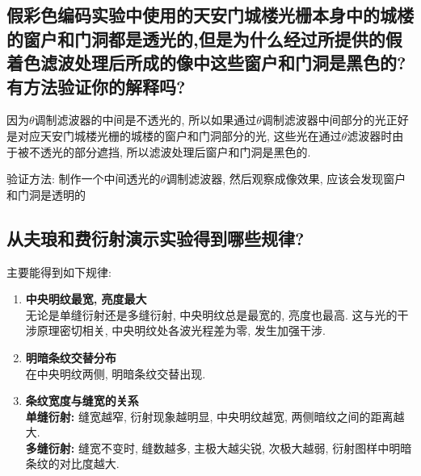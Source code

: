 \documentclass[zihao=5, UTF8]{article}
\theoremstyle{MyLineTheoremStyle} %
\theoremstyle{MyBlockTheoremStyle} %
\theoremstyle{MySubsubsectionStyle} %
\begin{document}
\subsection{假彩色编码实验中使用的天安门城楼光栅本身中的城楼的窗户和门洞都是透光的,但是为什么经过所提供的假着色滤波处理后所成的像中这些窗户和门洞是黑色的?有方法验证你的解释吗?}
因为$\theta$调制滤波器的中间是不透光的, 所以如果通过$\theta$调制滤波器中间部分的光正好是对应天安门城楼光栅的城楼的窗户和门洞部分的光, 这些光在通过$\theta$滤波器时由于被不透光的部分遮挡, 所以滤波处理后窗户和门洞是黑色的. 

验证方法: 制作一个中间透光的$\theta$调制滤波器, 然后观察成像效果, 应该会发现窗户和门洞是透明的
\subsection{从夫琅和费衍射演示实验得到哪些规律?}
主要能得到如下规律:
\begin{enumerate}
    \item \textbf{中央明纹最宽, 亮度最大} \\
    无论是单缝衍射还是多缝衍射, 中央明纹总是最宽的, 亮度也最高. 这与光的干涉原理密切相关, 中央明纹处各波光程差为零, 发生加强干涉. 

    \item \textbf{明暗条纹交替分布} \\
    在中央明纹两侧, 明暗条纹交替出现. 

    \item \textbf{条纹宽度与缝宽的关系} \\
    \textbf{单缝衍射: } 缝宽越窄, 衍射现象越明显, 中央明纹越宽, 两侧暗纹之间的距离越大.  \\
    \textbf{多缝衍射: } 缝宽不变时, 缝数越多, 主极大越尖锐, 次极大越弱, 衍射图样中明暗条纹的对比度越大. 
\end{enumerate}
\end{document}
